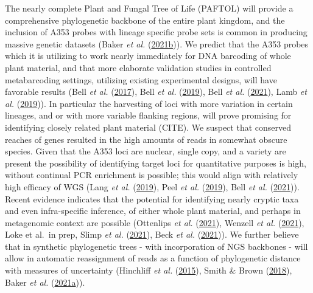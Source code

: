 \documentclass[
]{article}
\begin{document}
The nearly complete Plant and Fungal Tree of Life (PAFTOL) will provide
a comprehensive phylogenetic backbone of the entire plant kingdom, and
the inclusion of A353 probes with lineage specific probe sets is common
in producing massive genetic datasets (Baker \emph{et al.}
(\protect\hyperlink{ref-baker2021exploring}{2021b})). We predict that
the A353 probes which it is utilizing to work nearly immediately for DNA
barcoding of whole plant material, and that more elaborate validation
studies in controlled metabarcoding settings, utilizing existing
experimental designs, will have favorable results (Bell \emph{et al.}
(\protect\hyperlink{ref-bell2017applying}{2017}), Bell \emph{et al.}
(\protect\hyperlink{ref-bell2019quantitative}{2019}), Bell \emph{et al.}
(\protect\hyperlink{ref-bell2021comparing}{2021}), Lamb \emph{et al.}
(\protect\hyperlink{ref-lamb2019quantitative}{2019})). In particular the
harvesting of loci with more variation in certain lineages, and or with
more variable flanking regions, will prove promising for identifying
closely related plant material (CITE). We suspect that conserved reaches
of genes resulted in the high amounts of reads in somewhat obscure
species. Given that the A353 loci are nuclear, single copy, and a
variety are present the possibility of identifying target loci for
quantitative purposes is high, without continual PCR enrichment is
possible; this would align with relatively high efficacy of WGS (Lang
\emph{et al.} (\protect\hyperlink{ref-lang2019genome}{2019}), Peel
\emph{et al.} (\protect\hyperlink{ref-peel2019semi}{2019}), Bell
\emph{et al.} (\protect\hyperlink{ref-bell2021comparing}{2021})). Recent
evidence indicates that the potential for identifying nearly cryptic
taxa and even infra-specific inference, of either whole plant material,
and perhaps in metagenomic context are possible (Ottenlips \emph{et al.}
(\protect\hyperlink{ref-ottenlips2021resolving}{2021}), Wenzell \emph{et
al.} (\protect\hyperlink{ref-wenzell2021incomplete}{2021}), Loke et
al.~in prep, Slimp \emph{et al.}
(\protect\hyperlink{ref-slimp2021potential}{2021}), Beck \emph{et al.}
(\protect\hyperlink{ref-beck2021palmer}{2021})). We further believe that
in synthetic phylogenetic trees - with incorporation of NGS backbones -
will allow in automatic reassignment of reads as a function of
phylogenetic distance with measures of uncertainty (Hinchliff \emph{et
al.} (\protect\hyperlink{ref-hinchliff2015synthesis}{2015}), Smith \&
Brown (\protect\hyperlink{ref-smith2018constructing}{2018}), Baker
\emph{et al.} (\protect\hyperlink{ref-baker2021PAFTOL}{2021a})).
\end{document}
